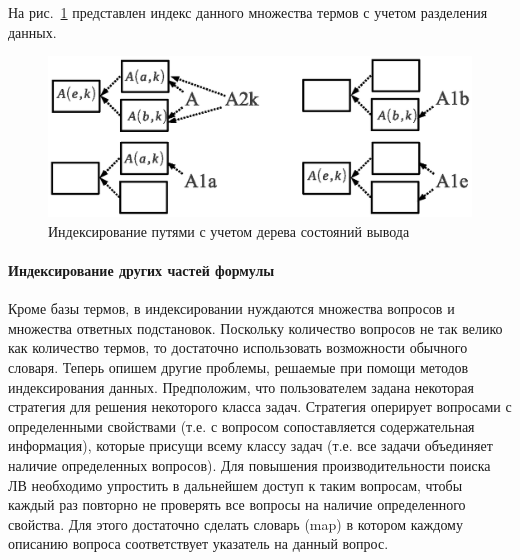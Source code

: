 На рис.~\ref{fig:sharedindex2} представлен индекс данного множества термов с учетом разделения данных.

\begin{figure}[h]
	\centering
	\includegraphics[width=0.7\linewidth]{pics/SharedIndex2.eps}
	\caption{Индексирование путями с учетом дерева состояний вывода}
	\label{fig:sharedindex2}
\end{figure}



\paragraph{Индексирование других частей формулы}
Кроме базы термов, в индексировании нуждаются множества вопросов и множества ответных подстановок. Поскольку количество вопросов не так велико как количество термов, то достаточно использовать возможности обычного словаря.
Теперь опишем другие проблемы, решаемые при помощи методов индексирования данных. Предположим, что пользователем задана некоторая стратегия для решения некоторого класса задач. Стратегия оперирует вопросами с определенными свойствами (т.е. с вопросом сопоставляется содержательная информация), которые присущи всему классу задач (т.е. все задачи объединяет наличие определенных вопросов). Для повышения производительности поиска ЛВ необходимо упростить в дальнейшем доступ к таким вопросам, чтобы каждый раз повторно не проверять все вопросы на наличие определенного свойства. Для этого достаточно сделать словарь (map) в котором каждому описанию вопроса соответствует указатель на данный вопрос. %



